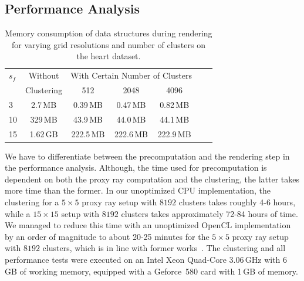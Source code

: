 \documentclass[journal]{vgtc}                %
\newcommand{\todo}[1]{\textbf{\textcolor{blue}{[TODO: {#1}]}}}
\begin{document}
%
%
%
\subsection{Performance Analysis}\label{subsec:performance}
\begin{table}[b]
  \caption{Memory consumption of data structures during rendering for varying grid resolutions and number of clusters on the heart dataset.}
  \label{tab:data_size}
  \begin{center}
    \begin{tabular}{|l|c|c|c|c|c|c|}
      \hline
      $s_f$ &  Without & \multicolumn{3}{c|}{With Certain Number of Clusters}\\
      	       & Clustering & 512 & 2048 & 4096\\
      \hline
      3	&	 2.7\,MB	&	0.39\,MB		&	0.47\,MB	&	0.82\,MB  \\
      10 	&	329\,MB	&	43.9\,MB		&	44.0\,MB	&	44.1\,MB	\\
      15	&	1.62\,GB	&	222.5\,MB		&	222.6\,MB	&	222.9\,MB \\
      \hline
    \end{tabular}
  \end{center}
\end{table}

We have to differentiate between the precomputation and the rendering step in the performance analysis. Although, the time used for precomputation is dependent on both the proxy ray computation and the clustering, the latter takes more time than the former. In our unoptimized CPU implementation, the clustering for a $5\times5$ proxy ray setup with $8192$ clusters takes roughly 4-6 hours, while a $15\times15$ setup with $8192$ clusters takes approximately 72-84 hours of time. We managed to reduce this time with an unoptimized OpenCL implementation by an order of magnitude to about 20-25 minutes for the $5\times5$ proxy ray setup with $8192$ clusters, which is in line with former works~\cite{mess10gpuclustering}. The clustering and all performance tests were executed on an Intel Xeon Quad-Core 3.06\,GHz with 6\,GB of working memory, equipped with a Geforce~580 card with 1\,GB of memory.
\end{document}
